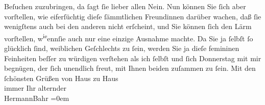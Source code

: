 \begin{ledgroupsized}[t]{13cm}
                    Beſuchen zuzubringen, da ſagt ſie lieber allen Nein. Nun können Sie ſich aber
                    vorſtellen, wie eiferſüchtig {\pb}dieſe
                    ſämmtlichen Freundinnen darüber wachen, daß ſie wenigſtens auch bei den anderen
                    nicht erſcheint, und Sie können ſich den Lärm vorſtellen, w\substVorne{}\textsuperscript{ie}\substDazwischen{}enn\substHinten{}{ }ſie auch nur eine einzige
                    Ausnahme machte. Da Sie ja ſelbſt ſo glücklich ſind, weiblichen Geſchlechts zu
                    ſein, werden Sie ja dieſe femininen Feinheiten beſſer zu würdigen verſtehen als
                    ich ſelbſt und ſich Donnerstag mit mir begnügen, der ſich unendlich
                    freut, mit Ihnen beiden
                    zuſammen zu ſein.\pend
           \pstart
           Mit den ſchönsten Grüßen von Haus zu Haus{\\[\baselineskip]}immer Ihr alternder{\\[\baselineskip]}\spacefill\mbox{HermannBahr}\pend
           \leftskip=0em{}\endnumbering{}\end{ledgroupsized}  \newcommand{\dateiname}{L02060}\newcommand{\titel}{Hermann Bahr an Olga Schnitzler, 27. 4. 1912}\newcommand{\editorInnen}{Martin Anton Müller und Gerd-Hermann Susen}
      